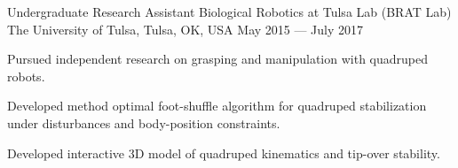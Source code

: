 \begin{cventries}
  \cventry
    {Undergraduate Research Assistant} %
    {Biological Robotics at Tulsa Lab (BRAT Lab)} %
    {The University of Tulsa, Tulsa, OK, USA} %
    {May 2015 --- July 2017} %
    {
      \begin{cvitems} %
        \item {Pursued independent research on grasping and manipulation with quadruped robots.}
        \item {Developed method optimal foot-shuffle algorithm for quadruped stabilization under disturbances and body-position constraints.}
        \item {Developed interactive 3D model of quadruped kinematics and tip-over stability.}
      \end{cvitems}
    }

\end{cventries}
